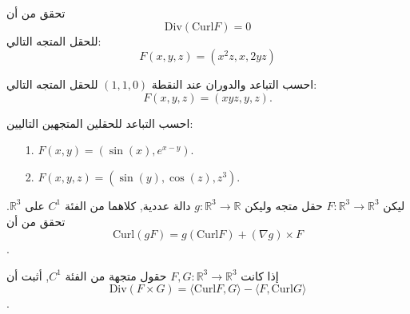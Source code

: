 \begin{exercice}
 تحقق من أن
\[ \text{Div} (\text{Curl} F) = 0 \]
للحقل المتجه التالي:
\[ F(x, y, z) = (x^2z, x, 2yz) \]
\end{exercice}

\begin{exercice}
    احسب التباعد والدوران عند النقطة \((1, 1, 0)\) للحقل المتجه التالي:
\[ F(x, y, z) = (xyz, y, z). \]
\end{exercice}

\begin{exercice}
احسب التباعد للحقلين المتجهين التاليين:
\begin{enumerate}[start=3]
\item [1.] \( F(x, y) = (\sin(x), e^{x-y}) \).
\item [2.] \( F(x, y, z) = (\sin(y), \cos(z), z^3) \).
 \end{enumerate}
\end{exercice}

\begin{exercice}
    ليكن \( F : \mathbb{R}^3 \to \mathbb{R}^3 \) حقل متجه وليكن \( g : \mathbb{R}^3 \to \mathbb{R} \) دالة عددية, كلاهما من الفئة \( C^1 \) على \(\mathbb{R}^3\). تحقق من أن
\[ \text{Curl} (gF) = g(\text{Curl} F) + (\nabla g) \times F \].
\end{exercice}

\begin{exercice} 
إذا كانت \( F, G : \mathbb{R}^3 \to \mathbb{R}^3 \) حقول متجهة من الفئة \( C^1 \), أثبت أن
\[ \text{Div} (F \times G) = \langle \text{Curl} F, G \rangle - \langle F, \text{Curl} G \rangle \].
\end{exercice}
